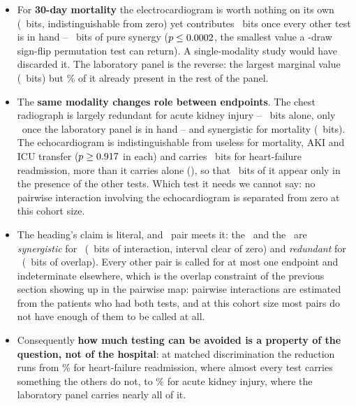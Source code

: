\documentclass[11pt]{article}
\theoremstyle{definition}
\theoremstyle{remark}
\begin{document}
\begin{itemize}
\item For \textbf{30-day mortality} the electrocardiogram is worth nothing on
  its own (\decEcgMarginal\ bits, indistinguishable from zero) yet contributes
  \decEcgConditional\ bits once every other test is in hand -- \decEcgSynergistic\
  bits of pure synergy ($p \le 0.0002$, the smallest value a
  \permNPerm-draw sign-flip permutation test can return). A single-modality
  study would have discarded
  it. The laboratory panel is the reverse: the largest marginal value
  (\decLabsMarginal\ bits) but \decLabsRedFrac\% of it already present in the
  rest of the panel.
\item The \textbf{same modality changes role between endpoints}. The chest
  radiograph is largely redundant for acute kidney injury -- \decCxrAkiMarg\
  bits alone, only \decCxrAkiCond\ once the laboratory panel is in hand -- and
  synergistic for mortality (\decCxrMortalitySyn\ bits). The echocardiogram is
  indistinguishable from useless for mortality, AKI and ICU transfer
  ($p \ge 0.917$ in each) and carries \decEchoHfReadmissionCond\ bits for heart-failure
  readmission, more than it carries alone (\decEchoHfReadmissionMarg), so that
  \decEchoHfReadmissionSyn\ bits of it appear only in the presence of the other
  tests. Which test it needs we cannot say: no pairwise interaction involving the
  echocardiogram is separated from zero at this cohort size.
\item The heading's claim is literal, and \flipNPairs\ pair meets it: the
  \flipPairA\ and the \flipPairB\ are \emph{synergistic} for
  \flipSynEndpoint\ (\flipSynBits\ bits of interaction, interval clear of
  zero) and \emph{redundant} for \flipRedEndpoint\ (\flipRedBits\ bits of
  overlap). Every other pair is called for at most one endpoint and
  indeterminate elsewhere, which is the overlap constraint of the previous
  section showing up in the pairwise map: pairwise interactions are estimated
  from the patients who had both tests, and at this cohort size most pairs do
  not have enough of them to be called at all.
\item Consequently \textbf{how much testing can be avoided is a property of the
  question, not of the hospital}: at matched discrimination the reduction runs
  from \redHfReadmissionAvoided\% for heart-failure readmission, where almost
  every test carries something the others do not, to \redAkiAvoided\% for acute
  kidney injury, where the laboratory panel carries nearly all of it.
\end{itemize}
\end{document}
